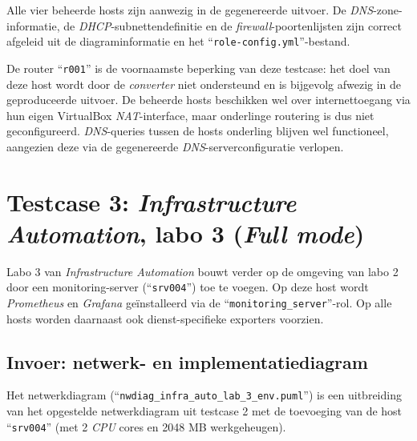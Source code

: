 Alle vier beheerde hosts zijn aanwezig in de gegenereerde uitvoer. De \emph{DNS}-zone-informatie, de \emph{DHCP}-subnettendefinitie en de \emph{firewall}-poortenlijsten zijn correct afgeleid uit de diagraminformatie en het ``\texttt{role-config.yml}''-bestand.

De router ``\texttt{r001}'' is de voornaamste beperking van deze testcase: het doel van deze host wordt door de \emph{converter} niet ondersteund en is bijgevolg afwezig in de geproduceerde uitvoer. De beheerde hosts beschikken wel over internettoegang via hun eigen VirtualBox \emph{NAT}-interface, maar onderlinge routering is dus niet geconfigureerd. \emph{DNS}-queries tussen de hosts onderling blijven wel functioneel, aangezien deze via de gegenereerde \emph{DNS}-serverconfiguratie verlopen.

\section{Testcase 3: \emph{Infrastructure Automation}, labo 3 (\emph{Full mode})}%
\label{sec:testcase3}

Labo 3 van \emph{Infrastructure Automation} bouwt verder op de omgeving van labo 2 door een monitoring-server (``\texttt{srv004}'') toe te voegen. Op deze host wordt \emph{Prometheus} en \emph{Grafana} geïnstalleerd via de ``\texttt{monitoring\_server}''-rol. Op alle hosts worden daarnaast ook dienst-specifieke exporters voorzien.

\subsection{Invoer: netwerk- en implementatiediagram}%
\label{subsec:testcase3_invoer}

Het netwerkdiagram (``\texttt{nwdiag\_infra\_auto\_lab\_3\_env.puml}'') is een uitbreiding van het opgestelde netwerkdiagram uit testcase 2 met de toevoeging van de host ``\texttt{srv004}'' (met 2 \emph{CPU} cores en 2048 MB werkgeheugen).

\begin{codeblockfixed}
    \begin{codeblock}
        
        \caption[Netwerkdiagram testcase 3 in tekstformaat (\emph{PlantUML})]{Tekstformaat (``\texttt{nwdiag\_infra\_auto\_lab\_3\_env.puml}'') van het netwerkdiagram voor testcase 3 (\emph{Infrastructure Automation}, labo 3).}
        \label{code:nwdiag_infra_auto_lab3}
    \end{codeblock}
\end{codeblockfixed}

